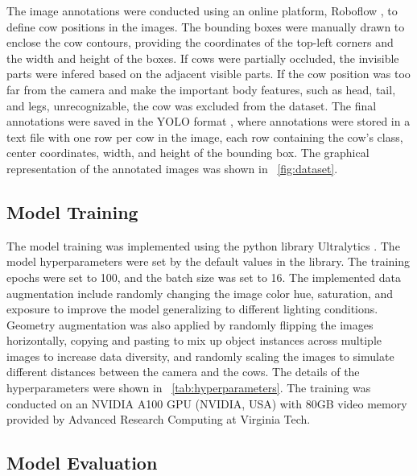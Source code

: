 The image annotations were conducted using an online platform, Roboflow \cite{roboflow2023}, to define cow positions in the images. The bounding boxes were manually drawn to enclose the cow contours, providing the coordinates of the top-left corners and the width and height of the boxes. If cows were partially occluded, the invisible parts were infered based on the adjacent visible parts. If the cow position was too far from the camera and make the important body features, such as head, tail, and legs, unrecognizable, the cow was excluded from the dataset. The final annotations were saved in the YOLO format \cite{ultralytics2023datasets}, where annotations were stored in a text file with one row per cow in the image, each row containing the cow's class, center coordinates, width, and height of the bounding box. The graphical representation of the annotated images was shown in ~\ref{fig:dataset}.

\subsection*{Model Training}

The model training was implemented using the python library Ultralytics \cite{ultralytics}. The model hyperparameters were set by the default values in the library. The training epochs were set to 100, and the batch size was set to 16. The implemented data augmentation include randomly changing the image color hue, saturation, and exposure to improve the model generalizing to different lighting conditions. Geometry augmentation was also applied by randomly flipping the images horizontally, copying and pasting to mix up object instances across multiple images to increase data diversity, and randomly scaling the images to simulate different distances between the camera and the cows. The details of the hyperparameters were shown in ~\ref{tab:hyperparameters}. The training was conducted on an NVIDIA A100 GPU (NVIDIA, USA) with 80GB video memory provided by Advanced Research Computing at Virginia Tech.


\subsection*{Model Evaluation}

